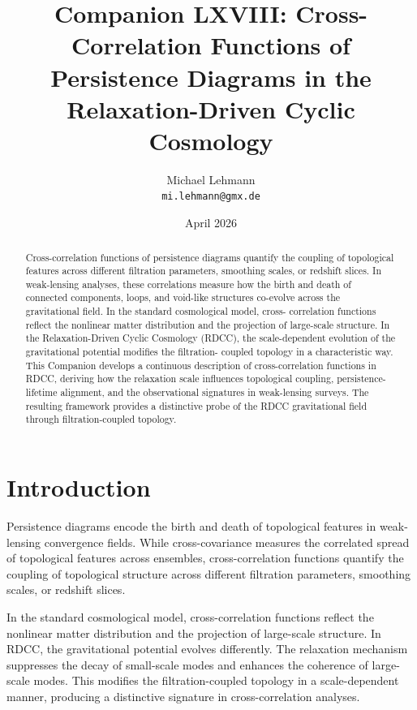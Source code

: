\documentclass[11pt,a4paper]{article}
\title{\textbf{Companion LXVIII: Cross-Correlation Functions of Persistence Diagrams in the Relaxation-Driven Cyclic Cosmology}}
\author{Michael Lehmann \\ \texttt{mi.lehmann@gmx.de}}
\date{April 2026}
\begin{document}
\maketitle

\begin{abstract}
Cross-correlation functions of persistence diagrams quantify the coupling of 
topological features across different filtration parameters, smoothing scales, or 
redshift slices. In weak-lensing analyses, these correlations measure how the 
birth and death of connected components, loops, and void-like structures co-evolve 
across the gravitational field. In the standard cosmological model, cross-
correlation functions reflect the nonlinear matter distribution and the projection 
of large-scale structure. In the Relaxation-Driven Cyclic Cosmology (RDCC), the 
scale-dependent evolution of the gravitational potential modifies the filtration-
coupled topology in a characteristic way. This Companion develops a continuous 
description of cross-correlation functions in RDCC, deriving how the relaxation 
scale influences topological coupling, persistence-lifetime alignment, and the 
observational signatures in weak-lensing surveys. The resulting framework provides 
a distinctive probe of the RDCC gravitational field through filtration-coupled 
topology.
\end{abstract}
\section{Introduction}

Persistence diagrams encode the birth and death of topological features in 
weak-lensing convergence fields. While cross-covariance measures the correlated 
spread of topological features across ensembles, cross-correlation functions 
quantify the coupling of topological structure across different filtration 
parameters, smoothing scales, or redshift slices.

In the standard cosmological model, cross-correlation functions reflect the 
nonlinear matter distribution and the projection of large-scale structure. In 
RDCC, the gravitational potential evolves differently. The relaxation mechanism 
suppresses the decay of small-scale modes and enhances the coherence of large-scale 
modes. This modifies the filtration-coupled topology in a scale-dependent manner, 
producing a distinctive signature in cross-correlation analyses.
\end{document}
